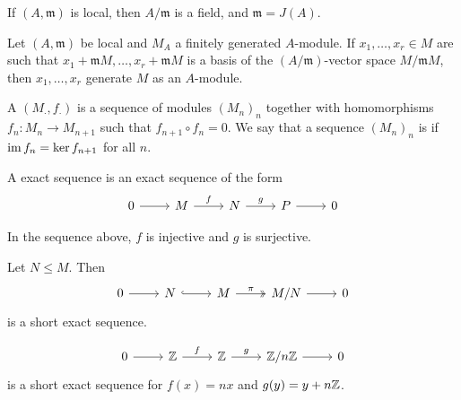 \begin{remark}
  If $(A, \mathfrak{m})$ is local, then $A / \mathfrak{m}$ is a field, and
  $\mathfrak{m} = J(A)$.
\end{remark}

\begin{corollary}
  Let $(A, \mathfrak{m})$ be local and $M_A$ a finitely generated $A$-module.
  If $x_1, \ldots, x_r \in M$ are such that $x_1 + \mathfrak{m} M, \ldots, x_r +
  \mathfrak{m} M$ is a basis of the $(A/\mathfrak{m})$-vector space $M /
  \mathfrak{m} M$, then $x_1, \ldots, x_r$ generate $M$ as an $A$-module.
\end{corollary}

\begin{definition}
  A  $(M_\cdot, f_\cdot)$ is a sequence of modules $(M_n)_n$
  together with homomorphisms $f_n: M_n \to M_{n+1}$ such that $f_{n+1} \circ
  f_n = 0$.
  We say that a sequence $(M_n)_n$ is  if $\operatorname{im} f_n = \operatorname{ker}
  f_{n+1}$ for all $n$.
\end{definition}

\begin{definition}
  A  exact sequence is an exact sequence of the form
  \[\begin{tikzcd}
	  0 & M & N & P & 0
	  \arrow[from=1-1, to=1-2]
	  \arrow["f", from=1-2, to=1-3]
	  \arrow["g", from=1-3, to=1-4]
	  \arrow[from=1-4, to=1-5]
	\end{tikzcd}\]
\end{definition}

\begin{remark}
  In the sequence above, $f$ is injective and $g$ is surjective.
\end{remark}

\begin{example}
  Let $N \le M$.
  Then
  \[\begin{tikzcd}
	  0 & N & M & {M/N} & 0
	  \arrow[from=1-1, to=1-2]
	  \arrow[hook, from=1-2, to=1-3]
	  \arrow["\pi", two heads, from=1-3, to=1-4]
	  \arrow[from=1-4, to=1-5]
	\end{tikzcd}\]
  is a short exact sequence.
\end{example}

\begin{example}
  \[\begin{tikzcd}
	  0 & \Z & \Z & {\Z/n \Z} & 0
	  \arrow[from=1-1, to=1-2]
	  \arrow["f", from=1-2, to=1-3]
	  \arrow["g", from=1-3, to=1-4]
	  \arrow[from=1-4, to=1-5]
	\end{tikzcd}\]
  is a short exact sequence for $f(x) = nx$ and $g(y) = y + n \mathbb{Z}$.
\end{example}

